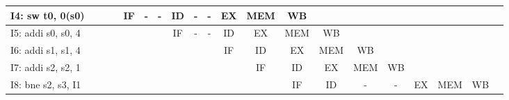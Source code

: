 \documentclass{article}
\begin{document}
\begin{table}[h]
{\begin{tabular}{|l|l|c|c|c|c|c|c|c|c|c|c|c|c|c|c|l|l|l|l|}
    I4: sw    t0, 0(s0)                         & \multicolumn{1}{c|}{}   &                       &                       & IF                    & -                     & -                     & ID                    & -                     & -                     & EX                    & MEM                   & WB                    &                       & \multicolumn{1}{l|}{} & \multicolumn{1}{l|}{} &                         &                          &                         &                         \\ \hline
    I5: addi  s0, s0, 4                         &                         & \multicolumn{1}{l|}{} & \multicolumn{1}{l|}{} & \multicolumn{1}{l|}{} & \multicolumn{1}{l|}{} & \multicolumn{1}{l|}{} & IF                    & -                     & -                     & ID                    & EX                    & MEM                   & WB                    & \multicolumn{1}{l|}{} & \multicolumn{1}{l|}{} &                         &                          &                         &                         \\ \hline
    I6: addi  s1, s1, 4                         &                         & \multicolumn{1}{l|}{} & \multicolumn{1}{l|}{} & \multicolumn{1}{l|}{} & \multicolumn{1}{l|}{} & \multicolumn{1}{l|}{} &                       &                       &                       & IF                    & ID                    & EX                    & MEM                   & WB                    &                       &                         &                          &                         &                         \\ \hline
    I7: addi  s2, s2, 1                         &                         & \multicolumn{1}{l|}{} & \multicolumn{1}{l|}{} & \multicolumn{1}{l|}{} & \multicolumn{1}{l|}{} & \multicolumn{1}{l|}{} & \multicolumn{1}{l|}{} &                       &                       &                       & IF                    & ID                    & EX                    & MEM                   & WB                    & \multicolumn{1}{c|}{}   &                          &                         &                         \\ \hline
    I8: bne   s2, s3, I1                        & \multicolumn{1}{c|}{}   &                       &                       &                       & \multicolumn{1}{l|}{} & \multicolumn{1}{l|}{} & \multicolumn{1}{l|}{} & \multicolumn{1}{l|}{} &                       &                       &                       & IF                    & ID                    & -                     & -                     & \multicolumn{1}{c|}{EX} & \multicolumn{1}{c|}{MEM} & \multicolumn{1}{c|}{WB} &                         \\ \hline

\end{tabular}}
\end{table}
\end{document}
